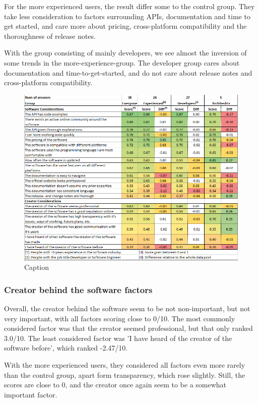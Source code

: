 \documentclass{article}
\begin{document}
For the more experienced users, the result differ some to the control
group. They take less consideration to factors surrounding APIs,
documentation and time to get started, and care more about pricing,
cross-platform compatibility and the thoroughness of release notes.

With the group consisting of mainly developers, we see almost the
inversion of some trends in the more-experience-group. The developer
group cares about documentation and time-to-get-started, and do not care
about release notes and cross-platform compatibility.

\begin{figure}
\centering
\includegraphics[width=\linewidth]{ScoresByPoints.png}
\caption{Caption}
\label{fig:scopresByPoints}
\end{figure}

\subsubsection{Creator behind the software factors}

Overall, the creator behind the software seem to be not non-important,
but not very important, with all factors scoring close to 0/10. The most
commonly considered factor was that the creator seemed professional, but
that only ranked 3.0/10. The least considered factor was 'I have heard of
the creator of the software before', which ranked -2.47/10.

With the more experienced users, they considered all factors even more
rarely than the control group, apart form transparency, which rose
slightly. Still, the scores are close to 0, and the creator once again
seem to be a somewhat important factor.
\end{document}
